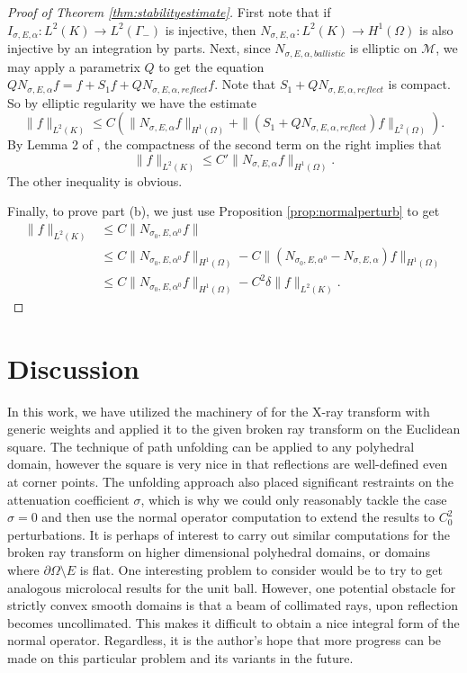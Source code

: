\documentclass[10pt]{amsart}
\theoremstyle{definition}
\theoremstyle{definition}
\theoremstyle{definition}
\begin{document}
\begin{proof}[Proof of Theorem \ref{thm:stabilityestimate}] First note that if $I_{\sigma, E, \alpha}: L^{2}(K) \to L^{2}(\Gamma_{-})$ is injective, then $N_{\sigma, E, \alpha}:L^{2}(K)\to H^{1}(\Omega)$ is also injective by an integration by parts. Next, since $N_{\sigma, E, \alpha, ballistic}$ is elliptic on $\mathcal{M}$, we may apply a parametrix $Q$ to get the equation $QN_{\sigma, E, \alpha}f = f + S_{1}f + QN_{\sigma, E, \alpha, reflect}f$. Note that $S_{1} + QN_{\sigma, E, \alpha, reflect}$ is compact. So by elliptic regularity we have the estimate
\begin{equation*}
\|f\|_{L^{2}(K)} \leq C( \| N_{\sigma, E, \alpha}f\|_{H^{1}(\Omega)}  + \|(S_{1} + QN_{\sigma, E, \alpha, reflect})f\|_{L^{2}(\Omega)}).
\end{equation*}
By Lemma 2 of \cite{stefanov1}, the compactness of the second term on the right implies that
\begin{equation*}
\|f\|_{L^{2}(K)} \leq C'\|N_{\sigma, E, \alpha}f\|_{H^{1}(\Omega)}.
\end{equation*}
The other inequality is obvious.

Finally, to prove part (b), we just use Proposition \ref{prop:normalperturb} to get
\begin{align*}
\|f\|_{L^{2}(K)} & \leq C \|N_{\sigma_{0}, E, \alpha^{0}}f \|\\
& \leq C\|N_{\sigma_{0}, E, \alpha^{0}}f\|_{H^{1}(\Omega)} - C\|(N_{\sigma_{0},E,\alpha^{0}} - N_{\sigma, E, \alpha})f\|_{H^{1}(\Omega)}\\
& \leq  C\|N_{\sigma_{0}, E, \alpha^{0}}f\|_{H^{1}(\Omega)} - C^{2}\delta \|f\|_{L^{2}(K)}.
\end{align*}
\end{proof}

\section{Discussion}
In this work, we have utilized the machinery of \cite{xraygeneric} for the X-ray transform with generic weights and applied it to the given broken ray transform on the Euclidean square. The technique of path unfolding can be applied to any polyhedral domain, however the square is very nice in that reflections are well-defined even at corner points. The unfolding approach also placed significant restraints on the attenuation coefficient $\sigma$, which is why we could only reasonably tackle the case $\sigma = 0$ and then use the normal operator computation to extend the results to $C_{0}^{2}$ perturbations. It is perhaps of interest to carry out similar computations for the broken ray transform on higher dimensional polyhedral domains, or domains where $\partial \Omega \setminus E$ is flat.  One interesting problem to consider would be to try to get analogous microlocal results for the unit ball. However, one potential obstacle for strictly convex smooth domains is that a beam of collimated rays, upon reflection becomes uncollimated. This makes it difficult to obtain a nice integral form of the normal operator. Regardless, it is the author's hope that more progress can be made on this particular problem and its variants in the future.

\nocite{*}


\end{document}
